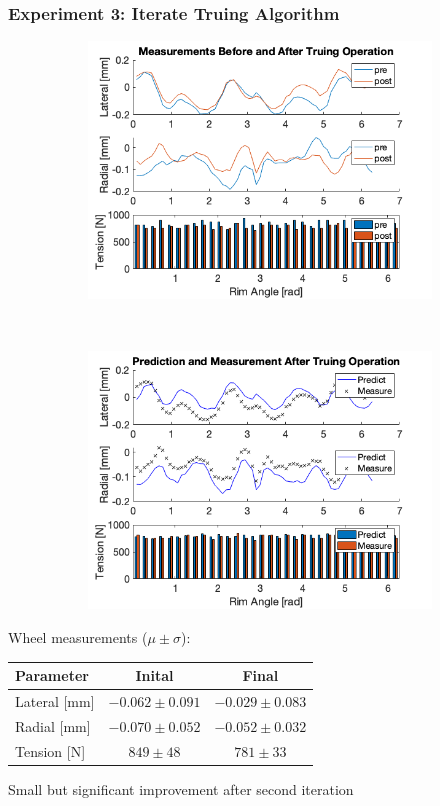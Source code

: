 \documentclass[mathserif]{beamer}
\begin{document}
\begin{frame}
\frametitle{Experiment 3: Iterate Truing Algorithm}
\begin{figure}
        \centering
        \begin{subfigure}[b]{0.45\textwidth}
            \includegraphics[width=\textwidth]{exp3_pre_post}
        \end{subfigure}
        ~
        \begin{subfigure}[b]{0.45\textwidth}
            \includegraphics[width=\textwidth]{exp3_predict_measure}
        \end{subfigure}
\end{figure}
Wheel measurements ($\mu \pm \sigma$):
\centering
\begin{tabular}{| l | c | c |}
    \hline
    Parameter & Inital & Final \\ \hline
    Lateral [mm] & $-0.062\pm0.091$ &$-0.029\pm 0.083$ \\ \hline 
    Radial [mm] &$-0.070\pm0.052$& $-0.052\pm0.032$ \\ \hline 
    Tension [N] &$849\pm48$& $781\pm33$ \\ \hline 
\end{tabular}
\begin{block}{}
    Small but significant improvement after second iteration
\end{block}
\end{frame}
\end{document}
